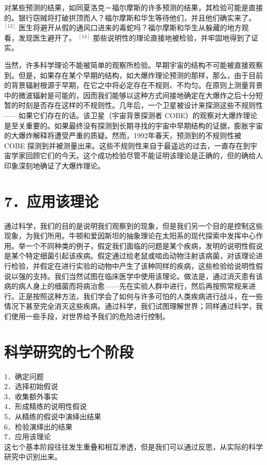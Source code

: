 对某些预测的结果，如同夏洛克－福尔摩斯的许多预测的结果，其检验可能是直接的。银行窃贼将打破拱顶而人？福尔摩斯和华生等待他们，并且他们确实来了。 ${ }^{[13]}$ 医生将避开从假的通风口进来的毒蛇吗？福尔摩斯和华生从躲藏的地方观看，发现医生避开了。 ${ }^{[14]}$ 那些说明性的理论直接地被检验，并牢固地得到了证实。

当然，许多科学理论不能被简单的观察所检验。早期宇宙的结构不可能被直接观察到。但是，如果存在某个早期的结构，如大爆炸理论预测的那样，那么，由于目前的背景辐射根源于早期，在它之中将必定存在不规则、不均匀。在原则上测量背景中的微波辐射是可能的，因而我们能够以这种方式间接地确定在大爆炸之后十分短暂的时刻是否存在这样的不规则性。几年后，一个卫星被设计来探测这些不规则性——如果它们存在的话。该卫星（宇宙背景探测者 COBE）的观察对大爆炸理论是至关重要的。如果最终没有探测到长期寻找的宇宙中早期结构的证据，膨胀宇宙的大爆炸解释将遭受严重的质疑。然而，1992年春天，预测到的不规则性被 COBE 探测到并被测量出来。这些不规则性来自于最遥远的过去，一直存在到宇宙学家回顾它们的今天。这个成功检验尽管不能证明该理论是正确的，但的确给人印象深刻地确证了大爆炸理论。

\section*{7．应用该理论}
通过科学，我们的目的是说明我们观察到的现象，但是我们另一个目的是控制这些现象，为我们所用。牛顿和爱因斯坦的抽象理论在太阳系的现代探索中发挥中心作用。举一个不同种类的例子，假定我们面临的问题是某个疾病，发明的说明性假说是某个特定细菌引起该疾病。假定通过给老鼠或啮齿动物注射该病菌，对该理论进行检验，并假定在进行实验的动物中产生了该种同样的疾病，这些检验给说明性假说以强的支持。我们当然试图在临床医学中使用该理论。做法是，通过消灭患有该病的病人身上的细菌而将病治愈——先在实验人群中进行，然后再按照常规来进行。正是按照这种方法，我们学会了如何与许多可怕的人类疾病进行战斗，在一些情况下甚至完全消灭这些疾病。通过科学，我们试图理解世界；同样通过科学，我们使用一些手段，对世界给予我们的危险进行控制。

\section*{科学研究的七个阶段}
1．确定问题\\
2．选择初始假说\\
3．收集额外事实\\
4．形成精练的说明性假说\\
5．从精练的假说中演绎出结果\\
6．检验演绎出的结果\\
7．应用该理论\\
这七个基本阶段往往发生重叠和相互渗透，但是我们可以通过反思，从实际的科学研究中识别出来。

